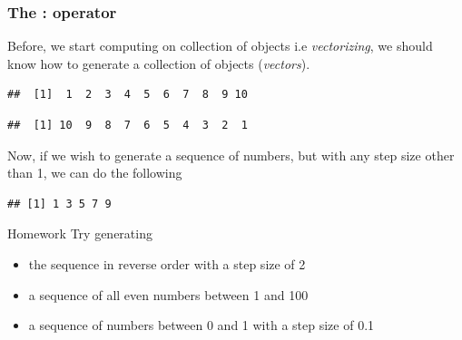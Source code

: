 \subsubsection{The : operator}
\noindent Before, we start computing on collection of objects i.e \emph{vectorizing}, we should know how to generate a collection of objects (\emph{vectors}). 
\begin{knitrout}
\color{fgcolor}\begin{kframe}
\begin{alltt}
\hlopt{:} 
\end{alltt}
\begin{verbatim}
##  [1]  1  2  3  4  5  6  7  8  9 10
\end{verbatim}
\begin{alltt}
\hlopt{:} 
\end{alltt}
\begin{verbatim}
##  [1] 10  9  8  7  6  5  4  3  2  1
\end{verbatim}
\end{kframe}
\end{knitrout}
\noindent Now, if we wish to generate a sequence of numbers, but with any step size other than 1, we can do the following
\begin{knitrout}
\color{fgcolor}\begin{kframe}
\begin{alltt}
\hlstd{(}\hlstd{,}\hlstd{,}\hlstd{=}\hlstd{)} 
\end{alltt}
\begin{verbatim}
## [1] 1 3 5 7 9
\end{verbatim}
\end{kframe}
\end{knitrout}
\begin{DIY}{Homework}
Try generating
\begin{itemize}
  \item the sequence in reverse order with a step size of 2
  \item a sequence of all even numbers between 1 and 100
  \item a sequence of numbers between 0 and 1 with a step size of 0.1
\end{itemize}
\end{DIY}

